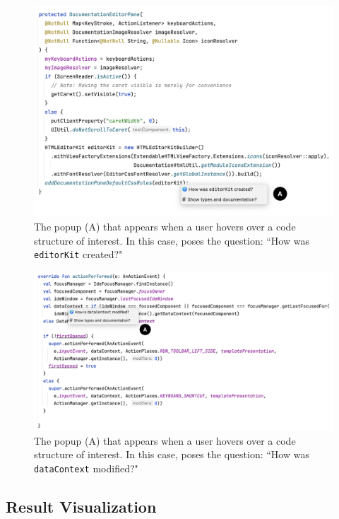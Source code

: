 \begin{figure}[ht]
\centering
\includegraphics[width=\textwidth]{./figs/reach-hover-invoke.png}
\caption{
  The \toolname{} popup (A) that appears when a user hovers over a code
  structure of interest. In this case, \toolname{} poses the question:
  ``How was \texttt{editorKit} created?"
}
\label{fig:ReachHoverInvokeBackward}
\end{figure}

\begin{figure}[ht]
\centering
\includegraphics[width=\textwidth]{./figs/reach-hover-invoke-forward.png}
\caption{
  The \toolname{} popup (A) that appears when a user hovers over a code
  structure of interest. In this case, \toolname{} poses the question:
  ``How was \texttt{dataContext} modified?"
}
\label{fig:ReachHoverInvokeForward}
\end{figure}

\subsection{Result Visualization}
\label{subsection:ResultVisualization}

